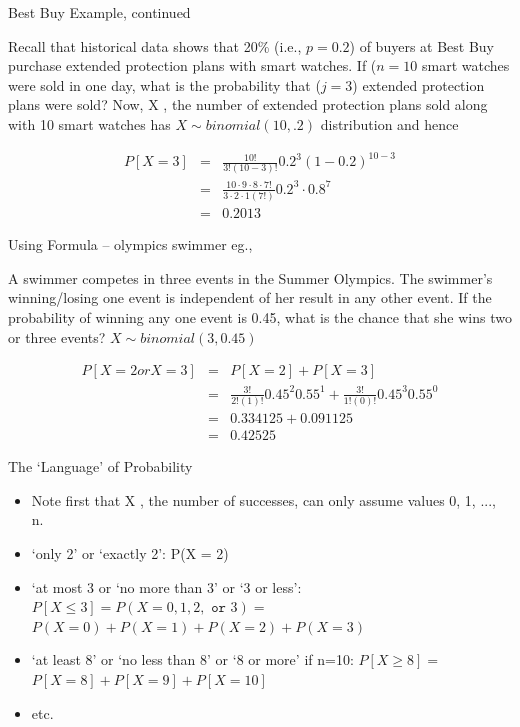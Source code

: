 \documentclass[14pt]{beamer}\usepackage[]{graphicx}\usepackage[]{color}
\begin{document}
\begin{frame}[fragile]{Best Buy Example, continued}

{\small{
Recall that historical data shows that 20\% (i.e., $p = 0.2$) of buyers at Best Buy purchase extended protection plans with smart watches. If ($n = 10$ smart watches were sold  in one day, what is the probability that ($j = 3$) extended protection plans were sold? Now, X , the number of extended protection plans sold along with 10 smart watches has $X \sim binomial(10, .2)$ distribution and hence

\begin{eqnarray*}
  P[X = 3] &=& \frac{10!}{3! (10 - 3)!} 0.2^3 ( 1 - 0.2)^{10 - 3} \\
  &=& \frac{10 \cdot 9 \cdot 8 \cdot 7!}{3 \cdot 2 \cdot 1 (7!)} 0.2^3 \cdot 0.8^7 \\
  &=& 0.2013 
\end{eqnarray*}
}}
\end{frame}

\begin{frame}[fragile]{Using Formula -- olympics swimmer eg.,}

{\small{
A swimmer competes in three events in the Summer Olympics. The  swimmer's winning/losing one event is independent of her result in any  other event. If the probability of winning any one event is 0.45, what is  the chance that she wins two or three events?  $X \sim binomial(3, 0.45)$

\begin{eqnarray*}
P[ X = 2 or X = 3] &=& P[X = 2] + P[X = 3] \\
&=& \frac{3!}{2! (1)!} 0.45^2 0.55^1 + \frac{3!}{1! (0)!} 0.45^3 0.55^0 \\
&=& 0.334125 + 0.091125 \\
&=& 0.42525
\end{eqnarray*}
}}
\end{frame}

\begin{frame}[fragile]{The ‘Language’ of Probability}

\begin{itemize}
\item<1-> Note first that X , the number of successes, can only assume  values 0, 1, ..., n.
\item<2-> `only 2' or `exactly 2': P(X = 2)
\item<3-> `at most 3 or `no more than 3' or `3 or less': 
$P[X \le 3] = P(X = 0, 1, 2, \texttt{ or } 3) =$ \\ $P(X = 0) + P(X = 1) + P(X = 2) + P(X = 3)$

\item<4-> `at least 8' or `no less than 8' or `8 or more' if n=10:
$P[X \ge 8] =$  \\ $P[X = 8] + P[X = 9] + P[X = 10]$
\item<5-> etc.
\end{itemize}
\end{frame}
\end{document}
